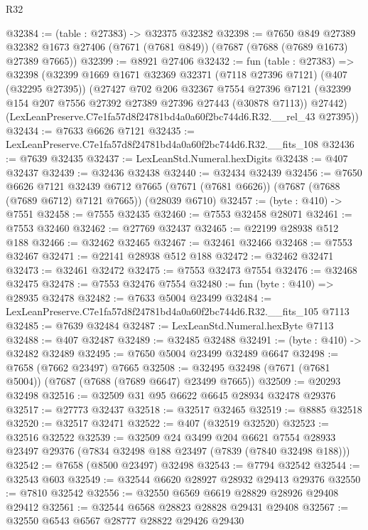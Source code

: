 \begin{lexlean}{R32}
\begin{coremodule}
@32384 := (table : @27383) -> @32375 @32382
@32398 := @7650
    @849
    @27389
    @32382
    @1673
    @27406
    (@7671 (@7681 @849))
    (@7687 (@7688 (@7689 @1673) @27389 @7665))
@32399 := @8921 @27406
@32432 := fun (table : @27383) =>
  @32398
    (@32399
      @1669
      @1671
      @32369
      @32371
      (@7118 @27396 @7121)
      (@407 (@32295 @27395))
      (@27427
        @702
        @206
        @32367
        @7554
        @27396
        @7121
        (@32399 @154 @207 @7556 @27392 @27389 @27396 @27443 (@30878 @7113))
        @27442)
      (LexLeanPreserve.C7e1fa57d8f24781bd4a0a60f2bc744d6.R32.__rel_43 @27395))
@32434 := @7633 @6626 @7121
@32435 := LexLeanPreserve.C7e1fa57d8f24781bd4a0a60f2bc744d6.R32.__fits_108
@32436 := @7639 @32435
@32437 := LexLeanStd.Numeral.hexDigits
@32438 := @407 @32437
@32439 := @32436 @32438
@32440 := @32434 @32439
@32456 := @7650
    @6626
    @7121
    @32439
    @6712
    @7665
    (@7671 (@7681 @6626))
    (@7687 (@7688 (@7689 @6712) @7121 @7665))
    (@28039 @6710)
@32457 := (byte : @410) -> @7551
@32458 := @7555 @32435
@32460 := @7553 @32458 @28071
@32461 := @7553 @32460
@32462 := @27769 @32437
@32465 := @22199 @28938 @512 @188
@32466 := @32462 @32465
@32467 := @32461 @32466
@32468 := @7553 @32467
@32471 := @22141 @28938 @512 @188
@32472 := @32462 @32471
@32473 := @32461 @32472
@32475 := @7553 @32473 @7554
@32476 := @32468 @32475
@32478 := @7553 @32476 @7554
@32480 := fun (byte : @410) => @28935 @32478
@32482 := @7633 @5004 @23499
@32484 := LexLeanPreserve.C7e1fa57d8f24781bd4a0a60f2bc744d6.R32.__fits_105 @7113
@32485 := @7639 @32484
@32487 := LexLeanStd.Numeral.hexByte @7113
@32488 := @407 @32487
@32489 := @32485 @32488
@32491 := (byte : @410) -> @32482 @32489
@32495 := @7650 @5004 @23499 @32489 @6647
@32498 := @7658 (@7662 @23497) @7665
@32508 := @32495 @32498 (@7671 (@7681 @5004)) (@7687 (@7688 (@7689 @6647) @23499 @7665))
@32509 := @20293 @32498
@32516 := @32509 @31 @95 @6622 @6645 @28934 @32478 @29376
@32517 := @27773 @32437
@32518 := @32517 @32465
@32519 := @8885 @32518
@32520 := @32517 @32471
@32522 := @407 (@32519 @32520)
@32523 := @32516 @32522
@32539 := @32509
    @24
    @3499
    @204
    @6621
    @7554
    @28933
    @23497
    @29376
    (@7834 @32498 @188 @23497 (@7839 (@7840 @32498 @188)))
@32542 := @7658 (@8500 @23497) @32498
@32543 := @7794 @32542
@32544 := @32543 @603
@32549 := @32544 @6620 @28927 @28932 @29413 @29376
@32550 := @7810 @32542
@32556 := @32550 @6569 @6619 @28829 @28926 @29408 @29412
@32561 := @32544 @6568 @28823 @28828 @29431 @29408
@32567 := @32550 @6543 @6567 @28777 @28822 @29426 @29430

\end{coremodule}
\end{lexlean}
